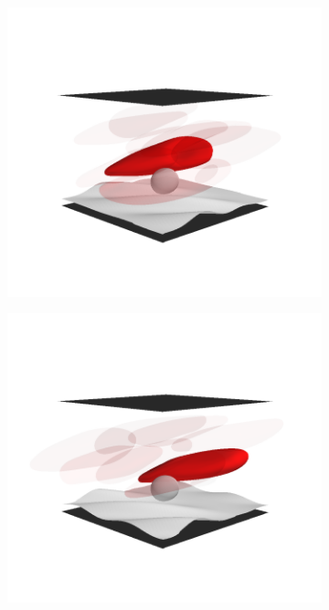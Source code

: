 \begin{figure}[tbp]
    \vspace{11pt}

    \begin{subfigure}[t]{0.5\textwidth}
        \includegraphics[trim=50 75 50 125, clip, width=\textwidth]{figures/unicycle3.png}%
    \end{subfigure}%
    \begin{subfigure}[t]{0.5\textwidth}
        \includegraphics[trim=50 75 50 125, clip, width=\textwidth]{figures/unicycle4.png}%
    \end{subfigure}


\end{figure}
